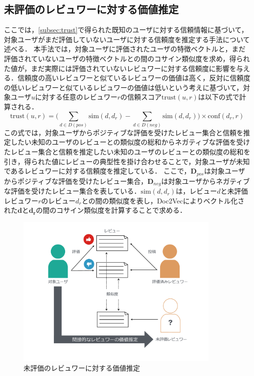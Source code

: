 \documentclass[a4paper,11pt,oneside,openany]{jsbook}
\begin{document}
	\subsection{未評価のレビュワーに対する価値推定}
\label{subsubsec:weight}
ここでは，\ref{subsec:trust}で得られた既知のユーザに対する信頼情報に基づいて，対象ユーザがまだ評価していないユーザに対する信頼度を推定する手法について述べる．
本手法では，対象ユーザに評価されたユーザの特徴ベクトルと，まだ評価されていないユーザの特徴ベクトルとの間のコサイン類似度を求め，得られた値が，まだ実際には評価されていないレビュワーに対する信頼度に影響を与える．信頼度の高いレビュワーと似ているレビュワーの価値は高く，反対に信頼度の低いレビュワーと似ているレビュワーの価値は低いという考えに基づいて，対象ユーザ$u$に対する任意のレビュワー$r$の信頼スコア$\mathrm{trust}(u, r)$は以下の式で計算される．
\begin{equation}
\mathrm{trust}(u ,r) = \biggl(\sum_{d\in{D(pos)}}\mathrm{sim}(d, d_{r})-\sum_{d\in{D(neg)}}\mathrm{sim}(d, d_{r})\biggr)\times\mathrm{conf}(d_{r}, r)
\end{equation}
この式では，対象ユーザからポジティブな評価を受けたレビュー集合と信頼を推定したい未知のユーザのレビューとの類似度の総和からネガティブな評価を受けたレビュー集合と信頼を推定したい未知のユーザのレビューとの類似度の総和を引き，得られた値にレビューの典型性を掛け合わせることで，対象ユーザが未知であるレビュワーに対する信頼度を推定している．
ここで，$\mathbf{D}_{pos}$は対象ユーザからポジティブな評価を受けたレビュー集合，$\mathbf{D}_{neg}$は対象ユーザからネガティブな評価を受けたレビュー集合を表している．$\mathrm{sim}(d, d_{r})$は，レビュー$d$と未評価レビュワー$r$のレビュー$d_r$との間の類似度を表し，Doc2Vecによりベクトル化された$\mathbf{d}$と$\mathbf{d_r}$の間のコサイン類似度を計算することで求める．
\begin{figure}[htb]
	\begin{center} %
		\includegraphics[width = 100mm]{figures/trust2.pdf} %
	\end{center}
	\caption{未評価のレビュワーに対する価値推定} %
	\label{fig:trust2} %
\end{figure}
\end{document}
